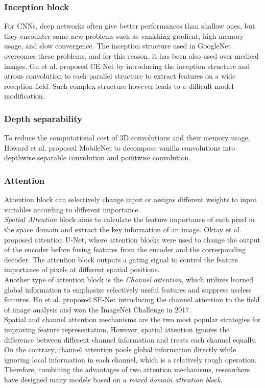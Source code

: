 \subsubsection{Inception block}
For CNNs, deep networks often give better performances than shallow ones, but they encounter some new problems such as vanishing gradient, high memory usage, and slow convergence. The inception structure used in GoogleNet overcomes these problems, and for this reason, it has been also used over medical images. Gu et al. proposed CE-Net by introducing the inception structure and atrous convolution to each parallel structure to extract features on a wide reception field. Such complex structure however leads to a difficult model modification.

\subsubsection{Depth separability}
To reduce the computational cost of 3D convolutions and their memory usage,
Howard et al. proposed MobileNet to decompose vanilla convolutions into
depthwise separable convolution and pointwise convolution.

\subsubsection{Attention}
\par
Attention block can selectively change input or assigns different weights to
input variables according to different importance.\\
\emph{Spatial Attention} block aims
to calculate the feature importance of each pixel in the space domain and extract
the key information of an image. Oktay et al. proposed attention U-Net, where
attention blocks were used to change the output of the encoder before fusing
features from the encoder and the corresponding decoder. The attention block
outputs a gating signal to control the feature importance of pixels at different
spatial positions.\\
Another type of attention block is the \emph{Channel attention},
which utilizes learned global information to emphasize selectively useful
features and suppress useless features. Hu et al. proposed SE-Net 
introducing the channel attention to the field of image analysis and won the
ImageNet Challenge in 2017.\\
Spatial and channel attention mechanisms are the two most popular strategies for
improving feature representation. However, spatial attention ignores the
difference between different channel information and treats each channel equally. On
the contrary, channel attention pools global information directly while
ignoring local information in each channel, which is a relatively rough
operation. Therefore, combining the advantages of two attention mechanisms,
researchers have designed many models based on a \emph{mixed domain attention block}.

